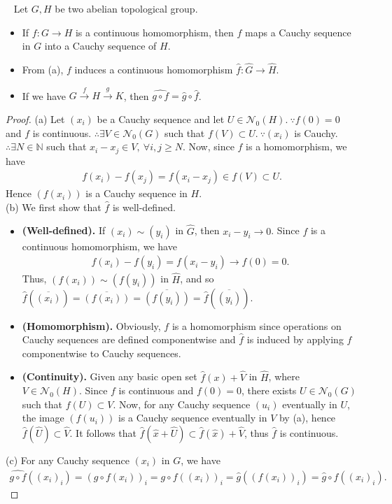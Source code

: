 \documentclass[12pt,a4paper,footinclude=true,headinclude=true]{scrbook} %
\newenvironment{proposition}[2][]
{\renewcommand\theinnercustomprop{#2}\innercustomprop[#1] 
\begin{mdframed}[backgroundcolor=gray!20]\ }
{\end{mdframed}\endinnercustomprop}
\begin{document}
\begin{proposition}{13}
    Let $G,H$ be two abelian topological group.
    \begin{itemize}
        \item[(a)]  If $f:G\to H$ is a continuous homomorphism, then $f$ maps a Cauchy sequence in $G$ into a Cauchy sequence of $H$.
        \item[(b)] From (a), $f$ induces a continuous homomorphism $\widehat{f}:\widehat{G}\to\widehat{H}$.
        \item[(c)] If we have $G\xrightarrow{f} H\xrightarrow{g} K$, then $\widehat{g\circ f}=\widehat{g}\circ\widehat{f}$.
    \end{itemize}
\end{proposition}
\begin{proof}
    (a) Let $(x_i)$ be a Cauchy sequence and let $U\in\mathcal{N}_0(H).\ \because f(0)=0$ and $f$ is continuous. $\therefore\exists V\in\mathcal{N}_0(G)$ such that $f(V)\subset U.\ \because (x_i)$ is Cauchy. $\therefore\exists N\in\mathbb{N}$ such that $x_i-x_j\in V,\ \forall i,j\geq N$. Now, since $f$ is a homomorphism, we have 
    \begin{align*}
        f(x_i)-f(x_j)=f(x_i-x_j)\in f(V)\subset U.
    \end{align*}
    Hence $(f(x_i))$ is a Cauchy sequence in $H$.\\
    (b) We first show that $\widehat{f}$ is well-defined.
    \begin{itemize}
        \item \textbf{(Well-defined).} If $(x_i)\sim(y_i)$ in $\widehat{G}$, then $x_i-y_i\longrightarrow0$. Since $f$ is a continuous homomorphism, we have
        \begin{align*}
            f(x_i)-f(y_i)=f(x_i-y_i)\longrightarrow f(0)=0. 
        \end{align*}
        Thus, $(f(x_i))\sim(f(y_i))$ in $\widehat{H}$, and so  $\widehat{f}(\overline{(x_i)})=\overline{(f(x_i))}=\overline{(f(y_i))}=\widehat{f}(\overline{(y_i)})$.
        \item \textbf{(Homomorphism).} Obviously, $f$ is a homomorphism since operations on Cauchy sequences are defined componentwise and $\widehat{f}$ is induced by applying $f$ componentwise to Cauchy sequences.
        \item \textbf{(Continuity).} Given any basic open set $\widehat{f}(x)+\widehat{V}$ in $\widehat{H}$, where $V\in\mathcal{N}_0(H)$. Since $f$ is continuous and $f(0)=0$, there exists $U\in\mathcal{N}_0(G)$ such that $f(U)\subset V$. Now, for any Cauchy sequence $(u_i)$ eventually in $U$, the image $(f(u_i))$ is a Cauchy sequence eventually in $V$ by (a), hence $\widehat{f}(\widehat{U})\subset\widehat{V}$. It follows that $\widehat{f}(\widehat{x}+\widehat{U})\subset\widehat{f}(\widehat{x})+\widehat{V}$, thus $\widehat{f}$ is continuous.
    \end{itemize}
    (c) For any Cauchy sequence $(x_i)$ in $G$, we have
    \begin{align*}
        \widehat{g\circ f}((x_i)_i)=(g\circ f(x_i))_i=g\circ f((x_i))_i=\widehat{g}((f(x_i))_i)=\widehat{g}\circ\widehat{f}((x_i)_i).
    \end{align*}
\end{proof}
\end{document}
